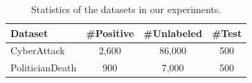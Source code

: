 \documentclass[letterpaper]{article}
\begin{document}
\begin{table}[!t]
\centering
\small
\caption{Statistics of the datasets in our experiments.}\label{tab:stats}
\begin{tabular}{lccc}
\toprule
\textbf{Dataset} & \textbf{\#Positive} & \textbf{\#Unlabeled} & \textbf{\#Test} \\
\midrule
CyberAttack  & 2,600 & 86,000 & 500 \\
PoliticianDeath & 900  & 7,000 & 500\\
\bottomrule
\end{tabular}
\end{table}






\end{document}
